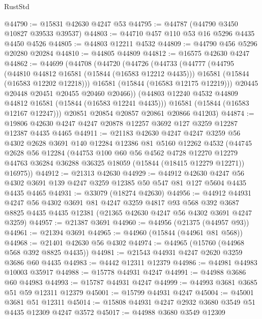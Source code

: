 \begin{lexlean}{RustStd}
\begin{coremodule}
@44790 := @15831 @42630 @4247 @53
@44795 := @44787 (@44790 @3450 @10827 @39533 @39537)
@44803 := @44710 @457 @110 @53 @16 @5296 @4435 @4450 @4526
@44805 := @44803 @12211 @4532
@44809 := @44790 @456 @5296 @20280 @20284
@44810 := @44805 @44809
@44812 := @16575 @42630 @4247
@44862 := @44699
    (@44708
      (@44720
        (@44726
          (@44733
            (@44777
              (@44795
                (@44810 @44812 @16581 (@15844 (@16583 @12212 @4435)))
                @16581
                (@15844 (@16583 @12202 @12218)))
              @16581
              (@15844 (@16583 @12175 @12219)))
            @20445
            @20448
            @20451
            @20455
            @20460
            @20466))
        (@44803 @12240 @4532 @44809 @44812 @16581 (@15844 (@16583 @12241 @4435)))
        @16581
        (@15844 (@16583 @12167 @12247)))
      @20851
      @20854
      @20857
      @20861
      @20866
      @41203)
@44874 := @19806 @42630 @4247 @4247 @20878 @12257 @3692 @127 @3259 @12287 @12387 @4435 @4465
@44911 := @21183
    @42630
    @4247
    @4247
    @3259
    @56
    @4302
    @2628
    @3691
    @140
    @12284
    @12386
    @81
    @5160
    @12262
    @4532
    (@44745
      @2628
      @56
      @12284
      (@44753
        @100
        @60
        @56
        @4562
        @4728
        @12270
        @12279
        @44763
        @36284
        @36288
        @36325
        @18059
        (@15844 (@18415 @12279 @12271))
        @16975))
@44912 := @21313 @42630
@44929 := @44912
    @42630
    @4247
    @56
    @4302
    @3691
    @139
    @4247
    @3259
    @12385
    @50
    @547
    @81
    @127
    @5604
    @4435
    @4435
    @4465
@44931 := @33079 (@18274 @42630)
@44956 := @44912
    @44931
    @4247
    @56
    @4302
    @3691
    @81
    @4247
    @3259
    @4817
    @93
    @568
    @392
    @3687
    @8825
    @4435
    @4435
    @12381
    (@21365 @42630 @4247 @56 @4302 @3691 @4247 @3259)
@44957 := @21387 @3691
@44960 := @44956 (@21375 (@44957 @93))
@44961 := @21394 @3691
@44965 := @44960 (@15844 (@44961 @81 @568))
@44968 := @21401 @42630 @56 @4302
@44974 := @44965 (@15760 (@44968 @568 @392 @8825 @4435))
@44981 := @21543 @44931 @4247 @2620 @3259 @3686 @60 @4435
@44983 := @4442 @12311 @12379
@44986 := @44981 @44983 @10003 @35917
@44988 := @15778 @44931 @4247
@44991 := @44988 @3686 @60 @44983
@44993 := @15787 @44931 @4247
@44999 := @44993 @3681 @3685 @51 @59 @12311 @12379
@45001 := @15799 @44931 @4247
@45004 := @45001 @3681 @51 @12311
@45014 := @15808 @44931 @4247 @2932 @3680 @3549 @51 @4435 @12309 @4247 @3572
@45017 := @44988 @3680 @3549 @12309

\end{coremodule}
\end{lexlean}
